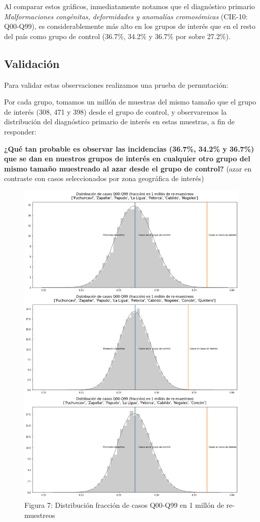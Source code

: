 \documentclass[]{article}
\begin{document}
Al comparar estos gráficos, inmediatamente notamos que el diagnóstico
primario \emph{Malformaciones congénitas, deformidades y anomalías
cromosómicas} (CIE-10: Q00-Q99), es considerablemente más alto en los
grupos de interés que en el resto del país como grupo de control
(36.7\%, 34.2\% y 36.7\% por sobre 27.2\%).

\hypertarget{validaciuxf3n}{%
\subsection{Validación}\label{validaciuxf3n}}

Para validar estas observaciones realizamos una prueba de permutación:

Por cada grupo, tomamos un millón de muestras del mismo tamaño que el
grupo de interés (308, 471 y 398) desde el grupo de control, y
observaremos la distribución del diagnóstico primario de interés en
estas muestras, a fin de responder:

\textbf{¿Qué tan probable es observar las incidencias (36.7\%, 34.2\% y
36.7\%) que se dan en nuestros grupos de interés en cualquier otro grupo
del mismo tamaño muestreado al azar desde el grupo de control?} (azar en
contraste con casos seleccionados por zona geográfica de interés)

\begin{figure}
\centering
\includegraphics{assets/distribucion.png}
\caption{Figura 7: Distribución fracción de casos Q00-Q99 en 1 millón de re-muestreos}
\end{figure}
\end{document}
